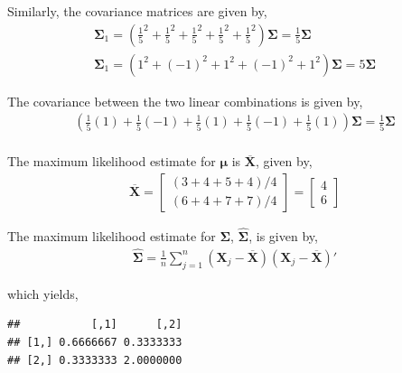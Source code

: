 \documentclass[12pt]{article}\usepackage[]{graphicx}\usepackage[]{color}
\makeatletter
\newenvironment{kframe}{%
 \def\at@end@of@kframe{}%
 \ifinner\ifhmode%
  \def\at@end@of@kframe{\end{minipage}}%
  \begin{minipage}{\columnwidth}%
 \fi\fi%
 \def\FrameCommand##1{\hskip\@totalleftmargin \hskip-\fboxsep
 \colorbox{shadecolor}{##1}\hskip-\fboxsep
     \hskip-\linewidth \hskip-\@totalleftmargin \hskip\columnwidth}%
 \MakeFramed {\advance\hsize-\width
   \@totalleftmargin\z@ \linewidth\hsize
   \@setminipage}}%
 {\par\unskip\endMakeFramed%
 \at@end@of@kframe}
\newenvironment{knitrout}{}{} %
\newenvironment{problem}[2][Problem]{\begin{trivlist}
\item[\hskip \labelsep {\bfseries #1}\hskip \labelsep {\bfseries #2.}]}{\end{trivlist}}
\newcommand{\vct}{\mathbf}
\makeatother
\begin{document}
Similarly, the covariance matrices are given by,
\begin{align*}
\vct{\Sigma}_1 = \left(\frac{1}{5}^2 + \frac{1}{5}^2 + \frac{1}{5}^2 + \frac{1}{5}^2 + \frac{1}{5}^2\right)\vct{\Sigma} = \frac{1}{5}\vct{\Sigma}\\
\vct{\Sigma}_1 = \left(1^2 + (-1)^2 + 1^2 + (-1)^2 + 1^2\right)\vct{\Sigma} = 5\vct{\Sigma}
\end{align*}

The covariance between the two linear combinations is given by,
\begin{align*}
\left(\frac{1}{5}(1) + \frac{1}{5}(-1) + \frac{1}{5}(1) + \frac{1}{5}(-1) + \frac{1}{5}(1)\right)\vct{\Sigma} = \frac{1}{5}\vct{\Sigma}\\
\end{align*}


\begin{problem}{4.18}
\end{problem}

The maximum likelihood estimate for $\vct{\mu}$ is $\overline{\vct{X}}$, given by,
\begin{align*}
\overline{\vct{X}} = \begin{bmatrix} (3+4+5+4)/4 \\ (6+4+7+7)/4 \end{bmatrix} = \begin{bmatrix} 4 \\ 6 \end{bmatrix}
\end{align*}

The maximum likelihood estimate for $\vct{\Sigma}$, $\hat{\vct{\Sigma}}$, is given by,
\begin{align*}
\hat{\vct{\Sigma}} = \frac{1}{n}\sum_{j = 1}^n\left(\vct{X}_j - \overline{\vct{X}}\right)\left(\vct{X}_j - \overline{\vct{X}}\right)'
\end{align*}

which yields,
\begin{knitrout}
\color{fgcolor}\begin{kframe}
\begin{verbatim}
##           [,1]      [,2]
## [1,] 0.6666667 0.3333333
## [2,] 0.3333333 2.0000000
\end{verbatim}
\end{kframe}
\end{knitrout}
\end{document}

